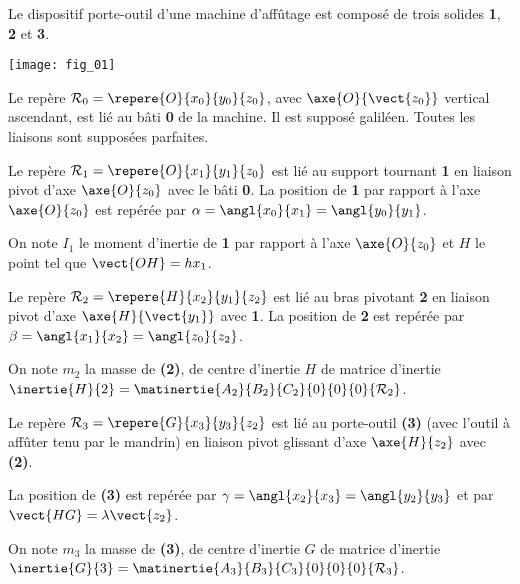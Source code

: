 \ifprof
\else
\begin{multicols}{2}
\fi

Le dispositif porte-outil d'une machine d'affûtage est composé de trois solides \textbf{1}, \textbf{2} et \textbf{3}. 

\begin{center}
\texttt{[image: fig\_01]}
\end{center}
Le repère $\mathcal{R}_0=\repere{O}{x_0}{y_0}{z_0}$, avec $\axe{O}{\vect{z_0}}$ vertical ascendant, est lié au bâti \textbf{0} de la machine. Il est supposé galiléen. Toutes les liaisons sont supposées parfaites.

Le repère $\mathcal{R}_1=\repere{O}{x_1}{y_1}{z_0}$ est lié au support tournant \textbf{1} en liaison pivot d'axe $\axe{O}{z_0}$ avec le bâti \textbf{0}. La position de \textbf{1} par rapport à l'axe $\axe{O}{z_0}$ est repérée par $\alpha=\angl{x_0}{x_1}=\angl{y_0}{y_1}$. 

On note $I_1$ le moment d'inertie de \textbf{1} par rapport à l'axe $\axe{O}{z_0}$ et $H$ le point tel que $\vect{OH}=h{x_1}$.

Le repère $\mathcal{R}_2=\repere{H}{x_2}{y_1}{z_2}$ est lié au bras pivotant \textbf{2} en liaison pivot d'axe $\axe{H}{\vect{y_1}}$ avec \textbf{1}. La position de \textbf{2} est repérée par $\beta=\angl{x_1}{x_2}=\angl{z_0}{z_2}$. 

On note $m_2$ la masse de \textbf{(2)}, de centre d'inertie $H$ de matrice d'inertie $\inertie{H}{2}=\matinertie{A_2}{B_2}{C_2}{0}{0}{0}{\mathcal{R}_2}$.

Le repère $\mathcal{R}_3=\repere{G}{x_3}{y_3}{z_2}$ est lié au porte-outil  \textbf{(3)} (avec l'outil à affûter tenu par le mandrin) en liaison pivot glissant d'axe $\axe{H}{z_2}$ avec \textbf{(2)}. 

La position de \textbf{(3)} est repérée par $\gamma=\angl{x_2}{x_3}=\angl{y_2}{y_3}$ et par $\vect{HG}=\lambda\vect{z_2}$. 

On note $m_3$ la masse de \textbf{(3)}, de centre d'inertie $G$ de matrice d'inertie $\inertie{G}{3}=\matinertie{A_3}{B_3}{C_3}{0}{0}{0}{\mathcal{R}_3}$.







\ifprof
\else
\end{multicols}
\fi


